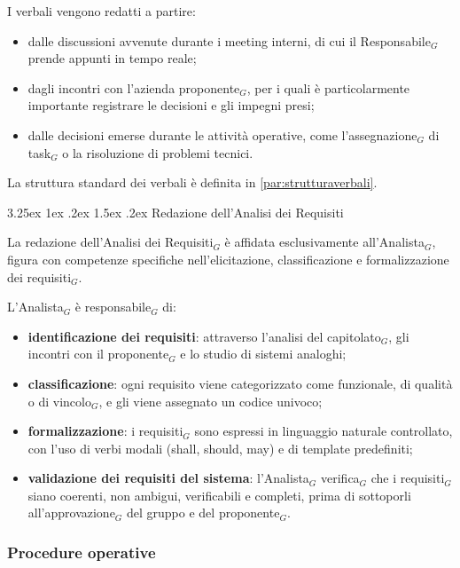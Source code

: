 \documentclass[a4paper, 10pt]{article}
\makeatletter
\renewcommand\paragraph{\@startsection{paragraph}{4}{\z@}%
  {3.25ex \@plus1ex \@minus .2ex}%
  {1.5ex \@plus .2ex}%
  {\normalfont\normalsize\bfseries}}
\makeatother
\begin{document}
I verbali vengono redatti a partire:
\begin{itemize}
    \item dalle discussioni avvenute durante i meeting interni, di cui il Responsabile$_G$ prende appunti in tempo reale;
    \item dagli incontri con l'azienda proponente$_G$, per i quali è particolarmente importante registrare le decisioni e gli impegni presi;
    \item dalle decisioni emerse durante le attività operative, come l'assegnazione$_G$ di task$_G$ o la risoluzione di problemi tecnici.
\end{itemize}

La struttura standard dei verbali è definita in \ref{par:strutturaverbali}.

\paragraph{Redazione dell'Analisi dei Requisiti}

La redazione dell'Analisi dei Requisiti$_G$ è affidata esclusivamente all'Analista$_G$, figura con competenze specifiche nell'elicitazione, classificazione e formalizzazione dei requisiti$_G$.

L'Analista$_G$ è responsabile$_G$ di:
\begin{itemize}
    \item \textbf{identificazione dei requisiti}: attraverso l'analisi del capitolato$_G$, gli incontri con il proponente$_G$ e lo studio di sistemi analoghi;
    \item \textbf{classificazione}: ogni requisito viene categorizzato come funzionale, di qualità o di vincolo$_G$, e gli viene assegnato un codice univoco;
    \item \textbf{formalizzazione}: i requisiti$_G$ sono espressi in linguaggio naturale controllato, con l'uso di verbi modali (shall, should, may) e di template predefiniti;
    \item \textbf{validazione dei requisiti del sistema}: l'Analista$_G$ verifica$_G$ che i requisiti$_G$ siano coerenti, non ambigui, verificabili e completi, prima di sottoporli all'approvazione$_G$ del gruppo e del proponente$_G$.
\end{itemize}

\subsubsection{Procedure operative}
\label{subsec:procedure_operative_doc}
\end{document}
